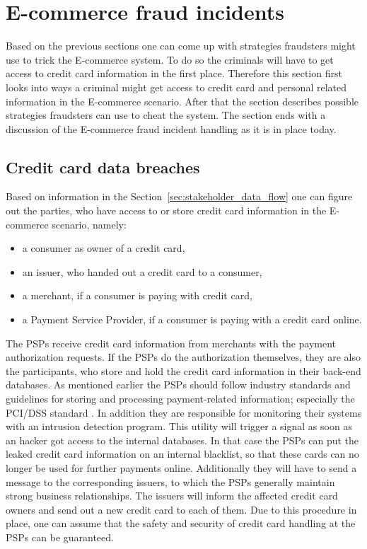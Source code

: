
\section{\Gls{E-commerce} fraud incidents}
\label{sec:scenario_fraud}

Based on the previous sections one can come up with strategies fraudsters might use to trick the \gls{E-commerce} system. To do so the criminals will have to get access to credit card information in the first place. Therefore this section first looks into ways a criminal might get access to credit card and personal related information in the \gls{E-commerce} scenario. After that the section describes possible strategies fraudsters can use to cheat the system. The section ends with a discussion of the \gls{E-commerce} fraud incident handling as it is in place today.

\subsection{Credit card data breaches}
\label{subsec:leaking_credit_cards}

Based on information in the Section~\ref{sec:stakeholder_data_flow} one can figure out the parties, who have access to or store credit card information in the \gls{E-commerce} scenario, namely:\@

\begin{itemize}
  \item a consumer as owner of a credit card,
  \item an issuer, who handed out a credit card to a consumer,
  \item a merchant, if a consumer is paying with credit card,
  \item a Payment Service Provider, if a consumer is paying with a credit card online.
\end{itemize}

The \gls{PSP}s receive credit card information from merchants with the payment authorization requests. If the \gls{PSP}s do the authorization themselves, they are also the participants, who store and hold the credit card information in their back-end databases. As mentioned earlier the \gls{PSP}s should follow industry standards and guidelines for storing and processing payment-related information; especially the \gls{PCI/DSS} standard \citep{virtue2009payment}. In addition they are responsible for monitoring their systems with an intrusion detection program. This utility will trigger a signal as soon as an hacker got access to the internal databases. In that case the \gls{PSP}s can put the leaked credit card information on an internal blacklist, so that these cards can no longer be used for further payments online. Additionally they will have to send a message to the corresponding issuers, to which the \gls{PSP}s generally maintain strong business relationships. The issuers will inform the affected credit card owners and send out a new credit card to each of them. Due to this procedure in place, one can assume that the safety and security of credit card handling at the \gls{PSP}s can be guaranteed. \\

